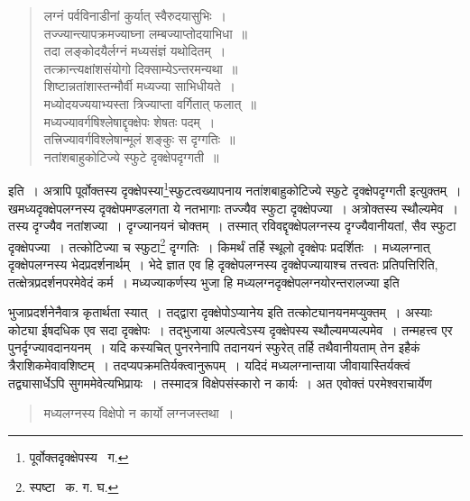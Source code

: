 \documentclass[11pt, openany]{book}
\begin{document}
\begin{quote}
{\qt लग्नं पर्वविनाडीनां कुर्यात् स्वैरुदयासुभिः~। \\
तज्ज्यान्त्यापक्रमज्याघ्ना लम्बज्याप्तोदयाभिधा~॥ \\
तदा लङ्कोदयैर्लग्नं मध्यसंज्ञं यथोदितम्~। \\
तत्क्रान्त्यक्षांशसंयोगो दिक्साम्येऽन्तरमन्यथा~॥ \\
शिष्टान्नतांशास्तन्मौर्वी मध्यज्या साभिधीयते~। \\
मध्योदयज्ययाभ्यस्ता त्रिज्याप्ता वर्गितात् फलात्~॥ \\
मध्यज्यावर्गषिश्लेषाद्दृक्क्षेपः शेषतः पदम्~। \\
तत्त्रिज्यावर्गविश्लेषान्मूलं शङ्कुः स दृग्गतिः~॥ \\
नतांशबाहुकोटिज्ये स्फुटे दृक्क्षेपदृग्गती~॥} 
\end{quote}

\noindent इति~। अत्रापि पूर्वोक्तस्य दृक्क्षेपस्या\renewcommand{\thefootnote}{२}\footnote{पूर्वोक्तदृक्क्षेपस्य \textendash\ ग.}स्फुटत्वख्यापनाय {\qt नतांशबाहुकोटिज्ये स्फुटे दृक्क्षेपदृग्गती} इत्युक्तम्~। खमध्यदृक्क्षेपलग्नस्य दृक्क्षेपमण्डलगता ये नतभागाः तज्ज्यैव स्फुटा दृक्क्षेपज्या~। अत्रोक्तस्य स्थौल्यमेव~। तस्य दृग्ज्यैव नतांशज्या~। दृग्ज्यानयनं चोक्तम्~। तस्मात् रविवद्दृक्क्षेपलग्नस्य दृग्ज्यैवानीयतां, सैव स्फुटा दृक्क्षेपज्या~। तत्कोटिज्या च स्फुटा\renewcommand{\thefootnote}{३}\footnote{स्पष्टा \textendash\ क. ग. घ.} दृग्गतिः~। किमर्थं तर्हि स्थूलो दृक्क्षेपः प्रदर्शितः~। मध्यलग्नात् दृक्क्षेपलग्नस्य भेदप्रदर्शनार्थम्~। भेदे ज्ञात एव हि
दृक्क्षेपलग्नस्य दृक्क्षेपज्यायाश्च तत्त्वतः प्रतिपत्तिरिति, तत्क्षेत्रप्रदर्शनपरमेवेदं कर्म~। मध्यज्याकर्णस्य भुजा हि मध्यलग्नदृक्क्षेपलग्नयोरन्तरालज्या इति 

\newpage

\noindent भुजाप्रदर्शनेनैवात्र कृतार्थता स्यात्~। तद्द्वारा दृक्क्षेपोऽप्यानेय इति तत्कोट्यानयनमप्युक्तम्~। अस्याः कोट्या ईषदधिक एव सदा दृक्क्षेपः~। तद्भुजाया अल्पत्वेऽस्य दृक्क्षेपस्य स्थौल्यमप्यल्पमेव~। तन्महत्त्व एर पुनर्दृग्ज्यावदानयनम्~। यदि कस्यचित् पुनरनेनापि तदानयनं स्फुरेत् तर्हि तथैवानीयताम् तेन इहैकं त्रैराशिकमेवावशिष्टम्~। तदप्यपक्रमतिर्यक्त्वानुरूपम्~। यदिदं मध्यलग्नान्ताया जीवायास्तिर्यक्त्वं तद्व्यासार्धेऽपि सुगममेवेत्यभिप्रायः~। तस्मादत्र विक्षेपसंस्कारो न कार्यः~। अत एवोक्तं परमेश्वराचार्येण\textendash 
 
\begin{quote}
{\qt मध्यलग्नस्य विक्षेपो न कार्यो लग्नजस्तथा~।} 
\end{quote}
 
\end{document}
